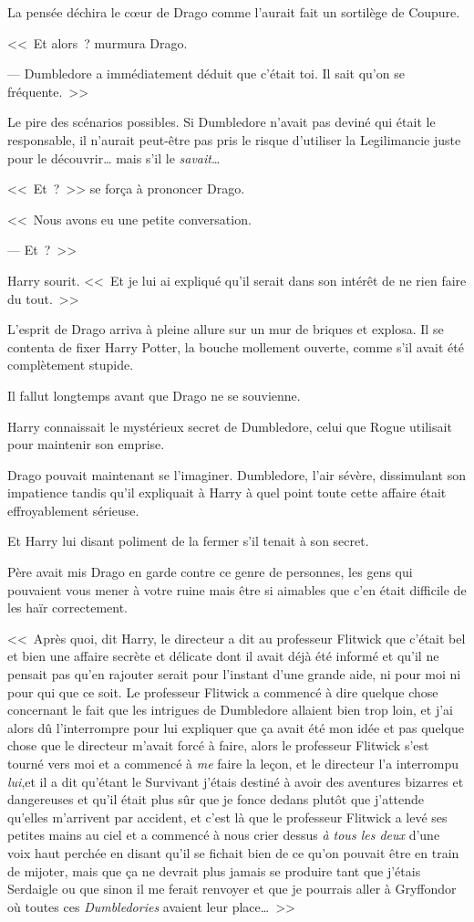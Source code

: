 La pensée déchira le cœur de Drago comme l'aurait fait un sortilège de Coupure.

<<~Et alors~? murmura Drago.

--- Dumbledore a immédiatement déduit que c'était toi. Il sait qu'on se fréquente.~>>

Le pire des scénarios possibles. Si Dumbledore n'avait pas deviné qui était le responsable, il n'aurait peut-être pas pris le risque d'utiliser la Legilimancie juste pour le découvrir… mais s'il le \emph{savait}…

<<~Et~?~>> se força à prononcer Drago.

<<~Nous avons eu une petite conversation.

--- Et~?~>>

Harry sourit. <<~Et je lui ai expliqué qu'il serait dans son intérêt de ne rien faire du tout.~>>

L'esprit de Drago arriva à pleine allure sur un mur de briques et explosa. Il se contenta de fixer Harry Potter, la bouche mollement ouverte, comme s'il avait été complètement stupide.

Il fallut longtemps avant que Drago ne se souvienne.

Harry connaissait le mystérieux secret de Dumbledore, celui que Rogue utilisait pour maintenir son emprise.

Drago pouvait maintenant se l'imaginer. Dumbledore, l'air sévère, dissimulant son impatience tandis qu'il expliquait à Harry à quel point toute cette affaire était effroyablement sérieuse.

Et Harry lui disant poliment de la fermer s'il tenait à son secret.

Père avait mis Drago en garde contre ce genre de personnes, les gens qui pouvaient vous mener à votre ruine mais être si aimables que c'en était difficile de les haïr correctement.

<<~Après quoi, dit Harry, le directeur a dit au professeur Flitwick que c'était bel et bien une affaire secrète et délicate dont il avait déjà été informé et qu'il ne pensait pas qu'en rajouter serait pour l'instant d'une grande aide, ni pour moi ni pour qui que ce soit. Le professeur Flitwick a commencé à dire quelque chose concernant le fait que les intrigues de Dumbledore allaient bien trop loin, et j'ai alors dû l'interrompre pour lui expliquer que ça avait été mon idée et pas quelque chose que le directeur m'avait forcé à faire, alors le professeur Flitwick s'est tourné vers moi et a commencé à \emph{me} faire la leçon, et le directeur l'a interrompu \emph{lui},et il a dit qu'étant le Survivant j'étais destiné à avoir des aventures bizarres et dangereuses et qu'il était plus sûr que je fonce dedans plutôt que j'attende qu'elles m'arrivent par accident, et c'est là que le professeur Flitwick a levé ses petites mains au ciel et a commencé à nous crier dessus \emph{à tous les deux} d'une voix haut perchée en disant qu'il se fichait bien de ce qu'on pouvait être en train de mijoter, mais que ça ne devrait plus jamais se produire tant que j'étais Serdaigle ou que sinon il me ferait renvoyer et que je pourrais aller à Gryffondor où toutes ces \emph{Dumbledories} avaient leur place…~>>

